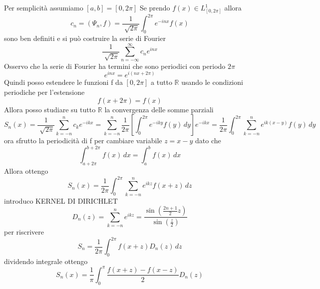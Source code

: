 \documentclass[a4paper,11pt]{report}
\theoremstyle{remark}
\theoremstyle{definition}
\newcommand{\R}{\mathbb{R}}
\begin{document}
Per semplicità assumiamo $[a,b] = [0,2\pi]$ \newline
Se prendo $f(x)\in L^1_{[0,2\pi]}$ allora 
\begin{equation*}
	c_n =(\Psi_n,f) = \frac{1}{\sqrt[]{2\pi}}\int_0^{2\pi} e^{-inx} f(x)
\end{equation*}
sono ben definiti e si può costruire la serie di Fourier
\begin{equation*}
	\frac{1}{\sqrt[]{2\pi}} \sum_{n=-\infty}^\infty c_n e^{inx}
\end{equation*}
Osservo che la serie di Fourier ha termini che sono periodici con periodo $2\pi$
\begin{equation*}
	e^{inx} = e^{i(nx+2\pi)}
\end{equation*}
Quindi posso estendere le funzioni f da $[0,2\pi]$ a tutto $\R$ usando le condizioni periodiche per l'estensione
\begin{equation*}
	f(x+2\pi) = f(x)
\end{equation*}
Allora posso studiare su tutto $\R$ la convergenza delle somme parziali
\begin{equation*}
	S_n(x) = \frac{1}{\sqrt[]{2\pi}} \sum_{k=-n}^n c_ke^{-ikx} = \sum_{k=-n}^n \frac{1}{2\pi} \left[\int_0^{2\pi} e^{-iky}f(y) \, dy\right] e^{-ikx} = \frac{1}{2\pi}\int_0^{2\pi} \sum_{k=-n}^n e^{ik(x-y)}f(y) \, dy 
\end{equation*}
ora sfrutto la periodicità di f per cambiare variabile $z = x-y$ dato che 
\begin{equation*}
	\int_{a+2\pi}^{b+2\pi} f(x)\, dx = \int_a^b f(x) \, dx 
\end{equation*}
Allora ottengo
\begin{equation*}
	S_n(x) = \frac{1}{2\pi} \int_0^{2\pi} \sum_{k=-n}^n e^{ikz}f(x+z) \, dz
\end{equation*}
introduco KERNEL DI DIRICHLET
\begin{equation*}
	D_n(z) = \sum_{k=-n}^n e^{ikz} = \frac{\sin{\left(\frac{2n+1}{2}z\right)}}{\sin{\left(\frac{z}{2}\right)}}
\end{equation*}
per riscrivere
\begin{equation*}
	S_n = \frac{1}{2\pi} \int_0^{2\pi} f(x+z)D_n(z) \, dz
\end{equation*}
dividendo integrale ottengo
\begin{equation*}
	S_n(x) = \frac{1}{\pi} \int_0^\pi \frac{f(x+z)-f(x-z)}{2}D_n(z)
\end{equation*}
\end{document}
